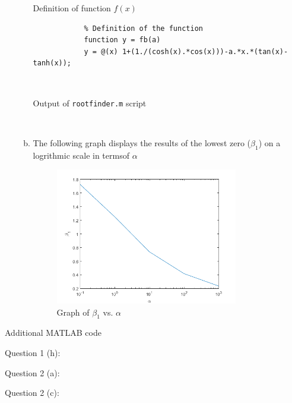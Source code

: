 \documentclass[11pt]{article}
\begin{document}
\begin{enumerate}
\begin{enumerate}[(a)]
			\begin{center}
				Definition of function $f(x)$
			\end{center}

			\begin{verbatim}
			% Definition of the function
			function y = fb(a)
			y = @(x) 1+(1./(cosh(x).*cos(x)))-a.*x.*(tan(x)-tanh(x));
			\end{verbatim} \

			\newpage
			\begin{center}
				Output of \texttt{rootfinder.m} script
			\end{center}

			 \

			\newpage
		\item The following graph displays the results of the lowest zero ($\beta_1$) on a logrithmic scale in termsof $\alpha$

			\begin{figure}[H]
				\center
				\includegraphics[width=0.8\textwidth]{semilogx.png}
				\caption{Graph of $\beta_1$ vs. $\alpha$}
			\end{figure}


	\end{enumerate}
\end{enumerate}

\newpage

\begin{center} Additional MATLAB code \end{center}

Question 1 (h):
 \

Question 2 (a):
 \

Question 2 (c):

\end{document}
